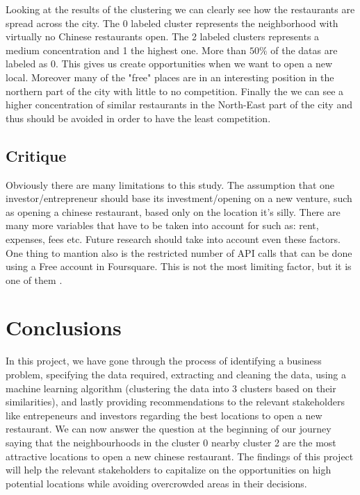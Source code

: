 \documentclass[12pt]{article} %
\begin{document}
Looking at the results of the clustering we can clearly see how the restaurants are spread across the city. The 0 labeled cluster represents the neighborhood with virtually no Chinese restaurants open. The 2 labeled clusters represents a medium concentration and 1 the highest one. More than $50\%$ of the datas are labeled as 0. This gives us create opportunities when we want to open a new local. Moreover many of the "free" places are in an interesting position in the northern part of the city with little to no competition. Finally the we can see a higher concentration of similar restaurants in the North-East part of the city and thus should be avoided in order to have the least competition.

\subsection{Critique}

Obviously there are many limitations to this study. The assumption that one investor/entrepreneur should base its investment/opening on a new venture, such as opening a chinese restaurant, based only on the location it's silly. There are many more variables that have to be taken into account for such as: rent, expenses, fees etc. Future research should take into account even these factors. One thing to mantion also is the restricted number of API calls that can be done using a Free account in Foursquare. This is not the most limiting factor, but it is one of them \cite{3:Fo}.



\section{Conclusions}
In this project, we have gone through the process of identifying a  business problem, specifying the data required, extracting and cleaning the data, using a machine learning algorithm (clustering the data into 3 clusters based on their similarities), and lastly providing recommendations to the relevant stakeholders like entrepeneurs and investors regarding the best locations to open a new restaurant. We can now answer the question at the beginning of our journey saying that the neighbourhoods in the cluster 0 nearby cluster 2 are the most attractive locations to open a new chinese restaurant. The findings of this project will help the relevant stakeholders to capitalize on the opportunities on high potential locations while avoiding overcrowded areas in their decisions.
\end{document}

